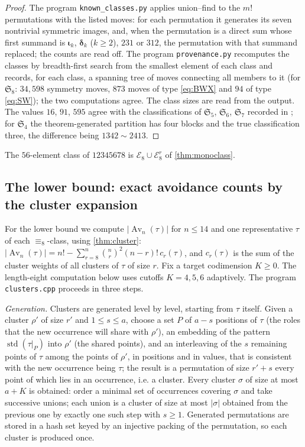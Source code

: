 \documentclass[11pt,reqno]{amsart}
\theoremstyle{plain}
\theoremstyle{definition}
\theoremstyle{remark}
\newcommand{\Av}{\operatorname{Av}}
\newcommand{\std}{\operatorname{std}}
\let\greekiota\iota
\renewcommand{\iota}{\boldsymbol{\greekiota}}
\newcommand{\dd}{\boldsymbol{\delta}}
\newcommand{\Sym}{\mathfrak{S}}
\begin{document}
\begin{proof}
The program \texttt{known\_classes.py} applies union--find to the $m!$ permutations with the listed moves: for each permutation it generates its seven nontrivial symmetric images, and, when the permutation is a direct sum whose first summand is $\iota_k$, $\dd_k$ ($k\ge2$), $231$ or $312$, the permutation with that summand replaced; the counts are read off. The program \texttt{provenance.py} recomputes the classes by breadth-first search from the smallest element of each class and records, for each class, a spanning tree of moves connecting all members to it (for $\Sym_8$: $34{,}598$ symmetry moves, $873$ moves of type \eqref{eq:BWX} and $94$ of type \eqref{eq:SW}); the two computations agree. The class sizes are read from the output. The values $16$, $91$, $595$ agree with the classifications of $\Sym_5$, $\Sym_6$, $\Sym_7$ recorded in \cite{Vatter2026}; for $\Sym_4$ the theorem-generated partition has four blocks and the true classification three, the difference being $1342\sim2413$.
\end{proof}

The $56$-element class of $12345678$ is $\mathcal E_8\cup\mathcal E_8^r$ of \cref{thm:monoclass}.

\subsection{The lower bound: exact avoidance counts by the cluster expansion}\label{sec:counts}
For the lower bound we compute $|\Av_n(\tau)|$ for $n\le14$ and one representative $\tau$ of each $\equiv_8$-class, using \cref{thm:cluster}: $|\Av_n(\tau)|=n!-\sum_{r=8}^{n}\binom nr^2(n-r)!\,c_r(\tau)$, and $c_r(\tau)$ is the sum of the cluster weights of all clusters of $\tau$ of size $r$. Fix a target codimension $K\ge0$. The length-eight computation below uses cutoffs $K=4,5,6$ adaptively. The program \texttt{clusters.cpp} proceeds in three steps.

\emph{Generation.} Clusters are generated level by level, starting from $\tau$ itself. Given a cluster $\rho'$ of size $r'$ and $1\le s\le a$, choose a set $P$ of $a-s$ positions of $\tau$ (the roles that the new occurrence will share with $\rho'$), an embedding of the pattern $\std(\tau|_P)$ into $\rho'$ (the shared points), and an interleaving of the $s$ remaining points of $\tau$ among the points of $\rho'$, in positions and in values, that is consistent with the new occurrence being $\tau$; the result is a permutation of size $r'+s$ every point of which lies in an occurrence, i.e. a cluster. Every cluster $\sigma$ of size at most $a+K$ is obtained: order a minimal set of occurrences covering $\sigma$ and take successive unions; each union is a cluster of size at most $|\sigma|$ obtained from the previous one by exactly one such step with $s\ge1$. Generated permutations are stored in a hash set keyed by an injective packing of the permutation, so each cluster is produced once.
\end{document}
